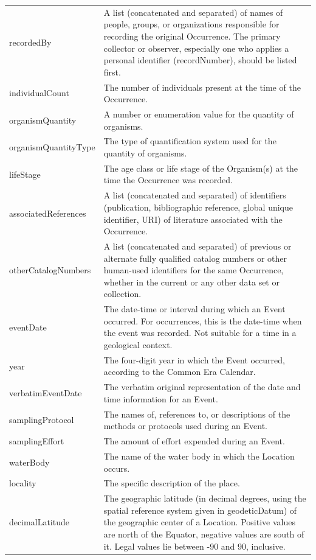 \documentclass[sn-apa,pdflatex]{sn-jnl}
\begin{document}
\begin{longtable}[t]{>{\raggedright\arraybackslash}p{15em}>{\raggedright\arraybackslash}p{30em}}
recordedBy & A list (concatenated and separated) of names of people, groups, or organizations responsible for recording the original Occurrence. The primary collector or observer, especially one who applies a personal identifier (recordNumber), should be listed first.\\
\addlinespace
individualCount & The number of individuals present at the time of the Occurrence.\\
organismQuantity & A number or enumeration value for the quantity of organisms.\\
organismQuantityType & The type of quantification system used for the quantity of organisms.\\
lifeStage & The age class or life stage of the Organism(s) at the time the Occurrence was recorded.\\
associatedReferences & A list (concatenated and separated) of identifiers (publication, bibliographic reference, global unique identifier, URI) of literature associated with the Occurrence.\\
\addlinespace
otherCatalogNumbers & A list (concatenated and separated) of previous or alternate fully qualified catalog numbers or other human-used identifiers for the same Occurrence, whether in the current or any other data set or collection.\\
eventDate & The date-time or interval during which an Event occurred. For occurrences, this is the date-time when the event was recorded. Not suitable for a time in a geological context.\\
year & The four-digit year in which the Event occurred, according to the Common Era Calendar.\\
verbatimEventDate & The verbatim original representation of the date and time information for an Event.\\
samplingProtocol & The names of, references to, or descriptions of the methods or protocols used during an Event.\\
\addlinespace
samplingEffort & The amount of effort expended during an Event.\\
waterBody & The name of the water body in which the Location occurs.\\
locality & The specific description of the place.\\
decimalLatitude & The geographic latitude (in decimal degrees, using the spatial reference system given in geodeticDatum) of the geographic center of a Location. Positive values are north of the Equator, negative values are south of it. Legal values lie between -90 and 90, inclusive.\\

\end{longtable}
\end{document}
